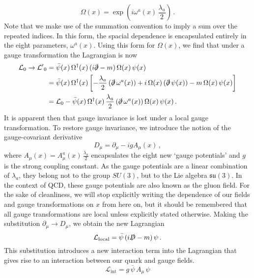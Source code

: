 %
\begin{equation}
\Omega(x)=\exp\left(i\omega^a(x)\,\frac{\lambda_a}{2}\right)\, .
\label{eq:LocalGaugeTransformation}
\end{equation}
%
Note that we make use of the summation convention to imply a sum over the repeated indices. In this form, the spacial dependence is encapsulated entirely in the eight parameters, $\omega^a(x)$.  Using this form for $\Omega(x)$, we find that under a gauge transformation the Lagrangian is now
%
\begin{align}
\mathcal{L}_0\rightarrow\mathcal{L^\prime}_0&=\bar{\psi}(x)\,\Omega^\dag(x)\,(i\slashed{\partial}-m)\,\Omega(x)\,\psi(x)\nonumber\\
&=\bar{\psi}(x)\,\Omega^\dag(x)\left[-\frac{\lambda_a}{2}\,(\slashed{\partial}\,\omega^a(x))+i\,\Omega(x)\,(\slashed{\partial}\,\psi(x))-m\,\Omega(x)\,\psi(x)\right]\nonumber\\
&= \mathcal{L}_0-\bar{\psi}(x)\,\Omega^\dag(x)\,\frac{\lambda_a}{2}\,(\slashed{\partial}\,\omega^a(x))\,\Omega(x)\,\psi(x)\, .
\label{eq:LocalTrans}
\end{align}
%
It is apparent then that gauge invariance is lost under a local gauge transformation. To restore gauge invariance, we introduce the notion of the gauge-covariant derivative
%
\begin{equation}
D_\mu = \partial_\mu - ig A_\mu(x)\, ,
\label{eq:CovariantDerivative}
\end{equation}
%
where $A_\mu(x)=A_\mu^a(x)\,\frac{\lambda_a}{2}$ encapsulates the eight new `gauge potentials' and $g$ is the strong coupling constant. As the gauge potentials are a linear combination of $\lambda_a$, they belong not to the group $SU(3)$, but to the Lie algebra $\mathfrak{su}(3)$. In the context of QCD, these gauge potentials are also known as the gluon field. For the sake of cleanliness, we will stop explicitly writing the dependence of our fields and gauge transformations on $x$ from here on, but it should be remembered that all gauge transformations are local unless explicitly stated otherwise. Making the substitution $\partial_\mu\rightarrow D_\mu$, we obtain the new Lagrangian
%
\begin{equation}
\mathcal{L}_\text{local} = \bar{\psi}\,(i\slashed{D}-m)\,\psi\,.
\end{equation}
%
This substitution introduces a new interaction term into the Lagrangian that gives rise to an interaction between our quark and gauge fields.
%
\begin{equation}
\mathcal{L}_\text{int} = g\,\bar{\psi}\,A_\mu\,\psi
\label{eq:InteractingLagrangian}
\end{equation}
